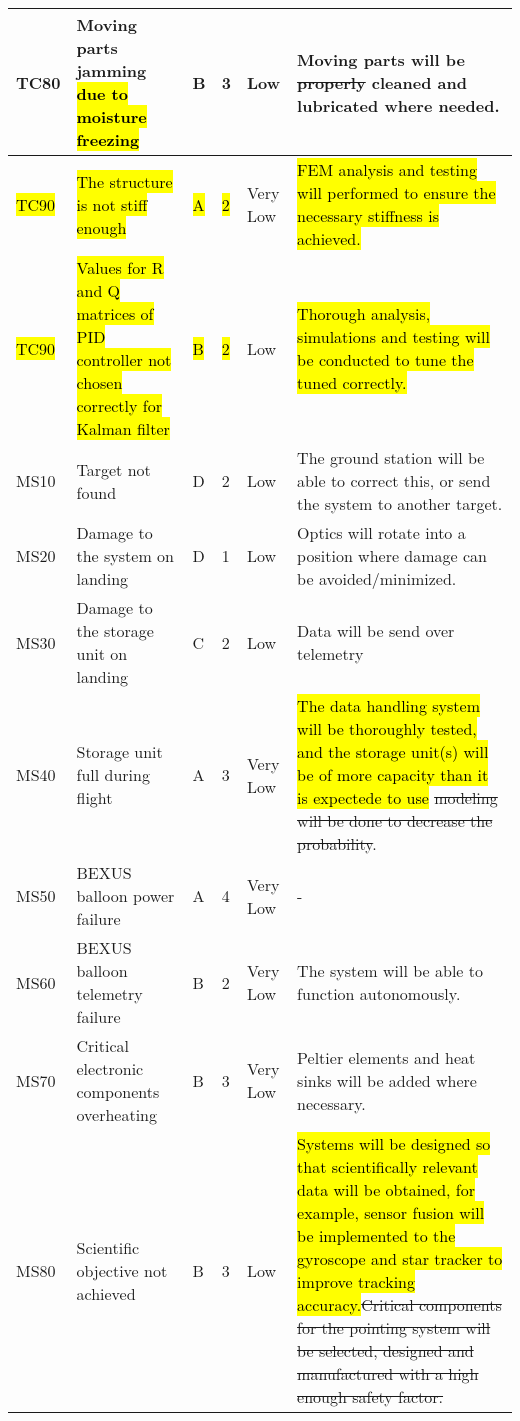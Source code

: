 \begin{longtable}{|m{}| m{} |m{} |m{}|m{}| m{}|}
TC80& Moving parts jamming \hl{due to moisture freezing}& B & 3 & \cellcolor[HTML]{FCFF2F} Low & Moving parts will be \st{properly} cleaned and lubricated where needed. \\\hline
\hl{TC90} & \hl{The structure is not stiff enough} & \hl{A} & \hl{2} & \cellcolor[HTML]{34FF34}Very Low & \hl{FEM analysis and testing will performed to ensure the necessary stiffness is achieved.} \\ \hline

\hl{TC90} & \hl{Values for R and Q matrices of PID controller not chosen correctly for Kalman filter} & \hl{B} & \hl{2} & \cellcolor[HTML]{FCFF2F}Low	& \hl{Thorough analysis, simulations and testing will be conducted to tune the tuned correctly.} \\ \hline

MS10 & Target not found	& D & 2 & \cellcolor[HTML]{FCFF2F}Low			& The ground station will be able to correct this, or send the system to another target.\\\hline

MS20 & Damage to the system on landing										& D & 1 & \cellcolor[HTML]{FCFF2F}Low			& Optics will rotate into a position where damage can be avoided/minimized.\\\hline

MS30 & Damage to the storage unit on landing									& C & 2 & \cellcolor[HTML]{FCFF2F}Low			& Data will be send over telemetry\\\hline

MS40 & Storage unit full during flight											& A & 3 & \cellcolor[HTML]{34FF34}Very Low	& \hl{The data handling system will be thoroughly tested, and the storage unit(s) will be of more capacity than it is expectede to use} \st{modeling will be done to decrease the probability}.\\\hline

MS50 & BEXUS balloon power failure											& A & 4 & \cellcolor[HTML]{34FF34}Very Low	& -\\\hline

MS60 & BEXUS balloon telemetry failure										& B & 2 & \cellcolor[HTML]{34FF34}Very Low	& The system will be able to function autonomously.\\\hline

MS70 & Critical electronic components overheating & B & 3 & \cellcolor[HTML]{34FF34}Very Low & Peltier elements and heat sinks will be added where necessary. \\\hline

MS80 & Scientific objective not achieved & B & 3 & \cellcolor[HTML]{FCFF2F} Low & \hl{Systems will be designed so that scientifically relevant data will be obtained, for example, sensor fusion will be implemented to the gyroscope and star tracker to improve tracking accuracy.}\st{Critical components for the pointing system will be selected, designed and manufactured with a high enough safety factor.}\\\hline


\end{longtable}
